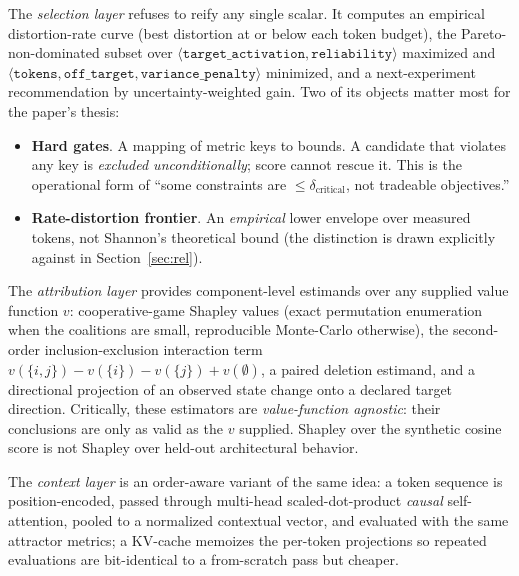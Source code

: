 The \emph{selection layer} refuses to reify any single scalar. It computes an
empirical distortion-rate curve (best distortion at or below each token budget),
the Pareto-non-dominated subset over
$\langle\texttt{target\_activation},\texttt{reliability}\rangle$ maximized and
$\langle\texttt{tokens},\texttt{off\_target},\texttt{variance\_penalty}\rangle$
minimized, and a next-experiment recommendation by uncertainty-weighted gain.
Two of its objects matter most for the paper's thesis:

\begin{itemize}[leftmargin=*]
  \item \textbf{Hard gates}. A mapping of metric keys to bounds. A candidate
  that violates any key is \emph{excluded unconditionally}; score cannot rescue
  it. This is the operational form of ``some constraints are
  $\le\delta_{\text{critical}}$, not tradeable objectives.''
  \item \textbf{Rate-distortion frontier}. An \emph{empirical} lower envelope
  over measured tokens, not Shannon's theoretical bound (the distinction is
  drawn explicitly against \citet{nagle2024promptrates} in
  Section~\ref{sec:rel}).
\end{itemize}

The \emph{attribution layer} provides component-level estimands over any supplied
value function $v$: cooperative-game Shapley values (exact permutation
enumeration when the coalitions are small, reproducible Monte-Carlo otherwise),
the second-order inclusion-exclusion interaction term
$v(\{i,j\})-v(\{i\})-v(\{j\})+v(\emptyset)$, a paired deletion estimand, and a
directional projection of an observed state change onto a declared target
direction. Critically, these estimators are \emph{value-function agnostic}: their
conclusions are only as valid as the $v$ supplied. Shapley over the synthetic
cosine score is not Shapley over held-out architectural behavior.

The \emph{context layer} is an order-aware variant of the same idea: a token
sequence is position-encoded, passed through multi-head scaled-dot-product
\emph{causal} self-attention, pooled to a normalized contextual vector, and
evaluated with the same attractor metrics; a KV-cache memoizes the per-token
projections so repeated evaluations are bit-identical to a from-scratch pass but
cheaper.